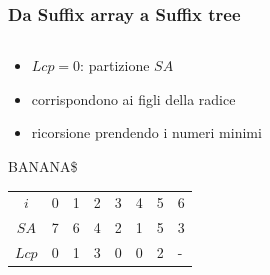 \begin{frame}[fragile]
\frametitle{Da Suffix array a Suffix tree}
\begin{columns}
\begin{column}{0.5\textwidth}
\begin{itemize}[<+->]
\item
$Lcp = 0$:  partizione $SA$
\item
corrispondono ai figli della radice
\item
ricorsione prendendo i numeri minimi
\end{itemize}
\begin{block}{BANANA\$}
\begin{tabular}[l]{|c|l|l|l|l|l|l|l|}
\hline
$i$&0&1&2&3&4&5&6\\
$SA$&7&6&4&2&1&5&3\\
$Lcp$&0&1&3&0&0&2&-\\\hline
\end{tabular}
\end{block}
\end{column}
\begin{column}{0.5\textwidth}
\begin{center}

\end{center}
\end{column}
\end{columns}
\end{frame}
